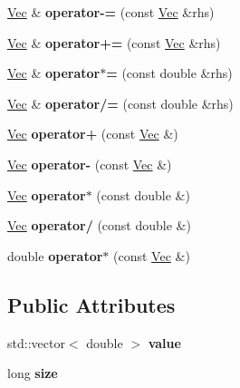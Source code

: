 \begin{DoxyCompactItemize}
\item 
\hyperlink{classVec}{Vec} \& {\bfseries operator-\/=} (const \hyperlink{classVec}{Vec} \&rhs)\hypertarget{classVec_adce31c56c9f71357dfea84f44e461d0c}{}\label{classVec_adce31c56c9f71357dfea84f44e461d0c}

\item 
\hyperlink{classVec}{Vec} \& {\bfseries operator+=} (const \hyperlink{classVec}{Vec} \&rhs)\hypertarget{classVec_aa5147cd7b8bbfde4d9cfe50c5ef06d0e}{}\label{classVec_aa5147cd7b8bbfde4d9cfe50c5ef06d0e}

\item 
\hyperlink{classVec}{Vec} \& {\bfseries operator$\ast$=} (const double \&rhs)\hypertarget{classVec_a1d19c62e25c778f17c57825979fdb774}{}\label{classVec_a1d19c62e25c778f17c57825979fdb774}

\item 
\hyperlink{classVec}{Vec} \& {\bfseries operator/=} (const double \&rhs)\hypertarget{classVec_afef031c2f4974301a8ebb4488eb7ba67}{}\label{classVec_afef031c2f4974301a8ebb4488eb7ba67}

\item 
\hyperlink{classVec}{Vec} {\bfseries operator+} (const \hyperlink{classVec}{Vec} \&)\hypertarget{classVec_acb13469c3a3644e1abf1ee519553ff56}{}\label{classVec_acb13469c3a3644e1abf1ee519553ff56}

\item 
\hyperlink{classVec}{Vec} {\bfseries operator-\/} (const \hyperlink{classVec}{Vec} \&)\hypertarget{classVec_a005a4aa5f7dae6324715187ddd650138}{}\label{classVec_a005a4aa5f7dae6324715187ddd650138}

\item 
\hyperlink{classVec}{Vec} {\bfseries operator$\ast$} (const double \&)\hypertarget{classVec_a9b6a01d2684968405d122f6b6c6051f9}{}\label{classVec_a9b6a01d2684968405d122f6b6c6051f9}

\item 
\hyperlink{classVec}{Vec} {\bfseries operator/} (const double \&)\hypertarget{classVec_a0fbd49c62772e5078e181f97265baf6f}{}\label{classVec_a0fbd49c62772e5078e181f97265baf6f}

\item 
double {\bfseries operator$\ast$} (const \hyperlink{classVec}{Vec} \&)\hypertarget{classVec_ac9421c042b0c2e0cbfd92ffa46608d96}{}\label{classVec_ac9421c042b0c2e0cbfd92ffa46608d96}

\end{DoxyCompactItemize}
\subsection*{Public Attributes}
\begin{DoxyCompactItemize}
\item 
std\+::vector$<$ double $>$ {\bfseries value}\hypertarget{classVec_a84e5d0f3dfe0e0a1ad564da467b3615c}{}\label{classVec_a84e5d0f3dfe0e0a1ad564da467b3615c}

\item 
long {\bfseries size}\hypertarget{classVec_a141b4ba2dd3195c5cb28f19297e77468}{}\label{classVec_a141b4ba2dd3195c5cb28f19297e77468}

\end{DoxyCompactItemize}
